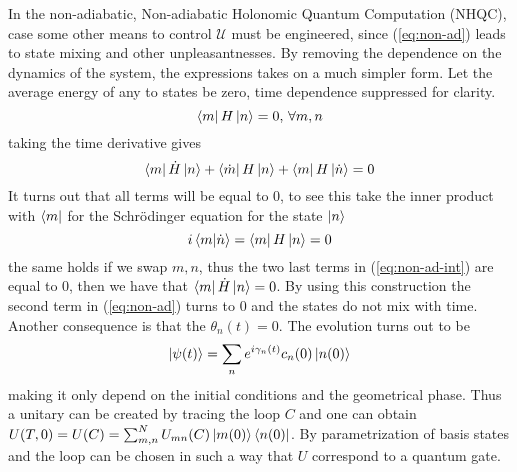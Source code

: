 In the non-adiabatic, Non-adiabatic Holonomic Quantum Computation (NHQC), case some other means to control $\mathcal{U}$ must be engineered, since (\ref{eq:non-ad}) leads to state mixing and other unpleasantnesses. By removing the dependence on the dynamics of the system, the expressions takes on a much simpler form. 
Let the average energy of any to states be zero\cite{NHQC}, time dependence suppressed for clarity.
\begin{equation}
\bra{m}H\ket{n} = 0,\,\forall m,n
\end{equation} 
taking the time derivative gives 
\begin{equation}
\label{eq:non-ad-int}
\bra{m}\dot{H}\ket{n} + \bra{\dot{m}}H\ket{n} + \bra{m}H\ket{\dot{n}} = 0
\end{equation}
It turns out that all terms will be equal to 0, to see this 
take the inner product with $\bra{m}$ for the Schrödinger equation for the state $\ket{n}$
\begin{equation}
i\bra{m}\ket{\dot{n}} = \bra{m}H\ket{n} = 0
\end{equation}
the same holds if we swap $m,n$, thus the two last terms in (\ref{eq:non-ad-int}) are equal to 0, then we have that $\bra{m}\dot{H}\ket{n} = 0$. By using this construction the second term in (\ref{eq:non-ad}) turns to 0 and the states do not mix with time. Another consequence is that the $\theta_n(t)= 0$. The evolution turns out to be 
\begin{equation}
\ket{\psi(t)} = \sum_{n}e^{i\gamma_n(t)}c_n(0)\ket{n(0)}
\end{equation}
making it only depend on the initial conditions and the geometrical phase.
Thus a unitary can be created by tracing the loop $C$ and one can obtain $U(T,0) = U(C) = \sum_{m,n}^N U_{mn}(C)\ket{m(0)}\bra{n(0)}$.
By parametrization of basis states and the loop can be chosen in such a way that $U$ correspond to a quantum gate.

